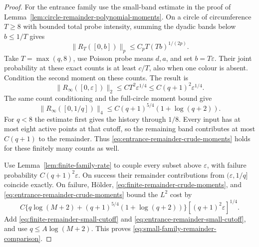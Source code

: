 \documentclass[11pt,letterpaper]{article}
\begin{document}
\begin{proof}
For the entrance family use the small-band estimate in the
proof of Lemma~\ref{lem:circle-remainder-polynomial-moments}.
On a circle of circumference $T\ge8$ with bounded total
probe intensity, summing the dyadic bands below $b\le1/T$
gives
\[
 \|R_T([0,b])\|_p\le C_pT(Tb)^{1/(2p)}.
\]
Take $T=\max(q,8)$, use Poisson probe means $d,a$, and set
$b=T\varepsilon$. Their joint probability at these exact
counts is at least $c/T$, also when one colour is absent.
Condition the second moment on these counts. The result is
\begin{equation}\label{eq:entrance-remainder-small-cutoff}
 \|R_\infty([0,\varepsilon])\|_2
                   \le CT^2\varepsilon^{1/4}
                   \le C(q+1)^2\varepsilon^{1/4}.
\end{equation}
The same count conditioning and the full-circle moment
bound give
\begin{equation}\label{eq:entrance-remainder-crude-moments}
 \|R_\infty([0,1/q])\|_4
                 \le C(q+1)^{5/4}(1+\log(q+2)).
\end{equation}
For $q<8$ the estimate first gives the history through $1/8$.
Every input has at most eight active points at that cutoff,
so the remaining band contributes at most $C(q+1)$ to
the remainder. Thus \eqref{eq:entrance-remainder-crude-moments}
holds for these finitely many counts as well.

Use Lemma~\ref{lem:finite-family-rate} to couple every subset
above $\varepsilon$, with failure probability
$C(q+1)^2\varepsilon$. On success their remainder contributions
from $(\varepsilon,1/q]$ coincide exactly. On failure,
H\"older, \eqref{eq:finite-remainder-crude-moments}, and
\eqref{eq:entrance-remainder-crude-moments} bound the $L^2$
cost by
\[
 C\{q\log(M+2)+(q+1)^{5/4}(1+\log(q+2))\}
                        [(q+1)^2\varepsilon]^{1/4}.
\]
Add \eqref{eq:finite-remainder-small-cutoff} and
\eqref{eq:entrance-remainder-small-cutoff}, and use
$q\le A\log(M+2)$. This proves
\eqref{eq:small-family-remainder-comparison}.
\end{proof}
\end{document}

